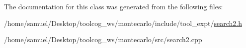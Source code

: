 The documentation for this class was generated from the following files\+:\begin{DoxyCompactItemize}
\item 
/home/samuel/\+Desktop/toolcog\+\_\+ws/montecarlo/include/tool\+\_\+expt/\hyperlink{search2_8h}{search2.\+h}\item 
/home/samuel/\+Desktop/toolcog\+\_\+ws/montecarlo/src/search2.\+cpp\end{DoxyCompactItemize}
